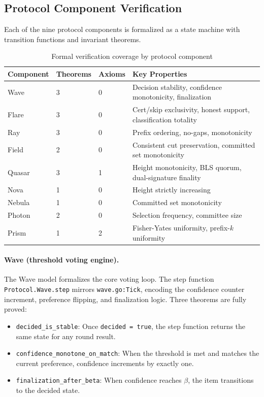 \subsection{Protocol Component Verification}

Each of the nine protocol components is formalized as a state machine with
transition functions and invariant theorems.

\begin{table}[h]
\centering
\caption{Formal verification coverage by protocol component}
\label{tab:formal}
\begin{tabular}{@{}llll@{}}
\toprule
Component & Theorems & Axioms & Key Properties \\
\midrule
Wave     & 3 & 0 & Decision stability, confidence monotonicity, finalization \\
Flare    & 3 & 0 & Cert/skip exclusivity, honest support, classification totality \\
Ray      & 3 & 0 & Prefix ordering, no-gaps, monotonicity \\
Field    & 2 & 0 & Consistent cut preservation, committed set monotonicity \\
Quasar   & 3 & 1 & Height monotonicity, BLS quorum, dual-signature finality \\
Nova     & 1 & 0 & Height strictly increasing \\
Nebula   & 1 & 0 & Committed set monotonicity \\
Photon   & 2 & 0 & Selection frequency, committee size \\
Prism    & 1 & 2 & Fisher-Yates uniformity, prefix-$k$ uniformity \\
\bottomrule
\end{tabular}
\end{table}

\paragraph{Wave (threshold voting engine).}
The Wave model formalizes the core voting loop. The step function \texttt{Protocol.Wave.step}
mirrors \texttt{wave.go:Tick}, encoding the confidence counter increment, preference
flipping, and finalization logic. Three theorems are fully proved:
\begin{itemize}[nosep]
\item \texttt{decided\_is\_stable}: Once \texttt{decided = true}, the step function
returns the same state for any round result.
\item \texttt{confidence\_monotone\_on\_match}: When the threshold is met and matches
the current preference, confidence increments by exactly one.
\item \texttt{finalization\_after\_beta}: When confidence reaches $\beta$, the item
transitions to the decided state.
\end{itemize}

